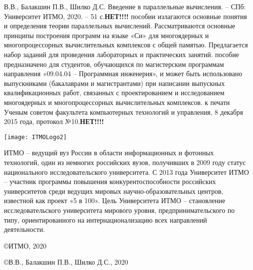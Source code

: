 { %
	\thispagestyle{empty} %
	 В.В., Балакшин П.В., Шилко Д.С. Введение в параллельные вычисления. – СПб: Университет ИТМО, 2020. – 51 с.\textbf{НЕТ!!!!}
	\newline
	\newline
	 пособии излагаются основные понятия и определения теории параллельных вычислений. Рассматриваются основные принципы построения программ на языке «Си» для многоядерных и многопроцессорных вычислительных комплексов с общей памятью. Предлагается набор заданий для проведения лабораторных и практических занятий.
	\newline
	\newline
	 пособие предназначено для студентов, обучающихся по магистерским программам направления «09.04.04 – Программная инженерия», и может быть использовано выпускниками (бакалаврами и магистрантами) при написании выпускных квалификационных работ, связанных с проектированием и исследованием многоядерных и многопроцессорных вычислительных комплексов.
	\newline
	\newline
	 к печати Ученым советом факультета компьютерных технологий и управления, 8 декабря 2015 года, протокол №10.\textbf{НЕТ!!!!}
	\vspace*{\fill} %
	\begin{flushright}
		\texttt{[image: ITMOLogo2]}
	\end{flushright}
	 ИТМО – ведущий вуз России в области информационных и фотонных технологий, один из немногих российских вузов, получивших в 2009 году статус национального исследовательского университета. С 2013 года Университет ИТМО – участник программы повышения конкурентоспособности российских университетов среди ведущих мировых научно-образовательных центров, известной как проект «5 в 100». Цель Университета ИТМО – становление исследовательского университета мирового уровня, предпринимательского по типу, ориентированного на интернационализацию всех направлений деятельности.
	\begin{flushright}
		\copyright{} ИТМО, 2020
		\par\copyright{} В.В., Балакшин П.В., Шилко Д.С., 2020
	\end{flushright}
}